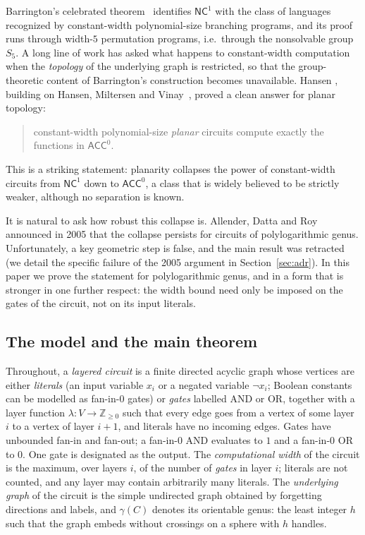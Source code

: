 \documentclass[11pt]{article}
\theoremstyle{definition}
\theoremstyle{remark}
\newcommand{\ACC}{\mathsf{ACC}^0}
\newcommand{\NC}{\mathsf{NC}^1}
\newcommand{\genus}{\gamma}
\newcommand{\layer}{\lambda}
\begin{document}
Barrington's celebrated theorem~\cite{Barrington89} identifies $\NC$ with the class of
languages recognized by constant-width polynomial-size branching programs, and its
proof runs through width-$5$ permutation programs, i.e.\ through the nonsolvable group
$S_5$. A long line of work has asked what happens to constant-width computation when
the \emph{topology} of the underlying graph is restricted, so that the group-theoretic
content of Barrington's construction becomes unavailable. Hansen \cite{Hansen03},
building on Hansen, Miltersen and Vinay~\cite{HMV02}, proved a clean answer for
planar topology:
\begin{quote}
constant-width polynomial-size \emph{planar} circuits compute exactly the functions in
$\ACC$.
\end{quote}
 This is a striking statement: planarity collapses the power of
constant-width circuits from $\NC$ down to $\ACC$, a class that is widely believed to be
strictly weaker, although no separation is known.

It is natural to ask how robust this collapse is. Allender, Datta and
Roy~\cite{ADR05} announced in 2005 that the collapse persists for circuits of
polylogarithmic genus.  Unfortunately, a key
geometric step is false, and the main result was retracted (we detail the specific failure of the 2005 argument in Section~\ref{sec:adr}).
In this paper we prove the statement for polylogarithmic genus, and in a
form that is stronger in one further respect: the width bound need only be imposed
on the gates of the circuit, not on its input literals.

\subsection{The model and the main theorem}\label{sec:mainthm}

Throughout, a \emph{layered circuit} is a finite directed acyclic graph whose vertices
are either \emph{literals} (an input variable $x_i$ or a negated variable $\lnot x_i$;
Boolean constants can be modelled as fan-in-$0$ gates) or \emph{gates} labelled
$\mathrm{AND}$ or $\mathrm{OR}$, together with a layer function
$\layer\colon V\to\mathbb{Z}_{\ge 0}$ such that every edge goes from a vertex of some
layer $i$ to a vertex of layer $i+1$, and literals have no incoming edges. Gates have
unbounded fan-in and fan-out; a fan-in-$0$ $\mathrm{AND}$ evaluates to $1$ and a
fan-in-$0$ $\mathrm{OR}$ to $0$. One gate is designated as the output. The
\emph{computational width} of the circuit is the maximum, over layers $i$, of the
number of \emph{gates} in layer $i$; literals are not counted, and any layer may
contain arbitrarily many literals. The \emph{underlying graph} of the circuit is the
simple undirected graph obtained by forgetting directions and labels, and
$\genus(C)$ denotes its orientable genus: the least integer $h$ such that the graph
embeds without crossings on a sphere with $h$ handles.
\end{document}

